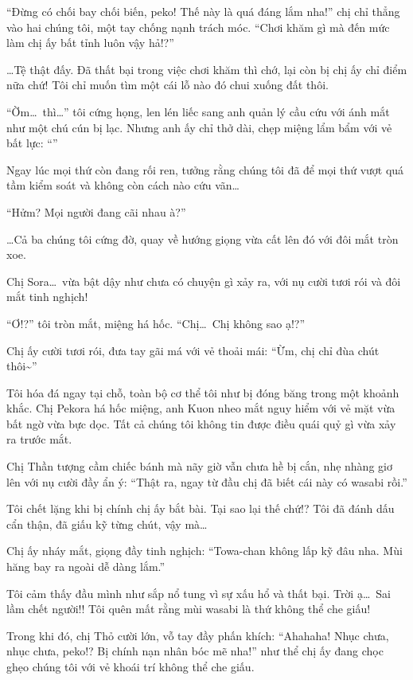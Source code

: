 \documentclass[../main.tex]{subfiles}
\begin{document}
``Đừng có chối bay chối biến, peko! Thế này là quá đáng lắm nha!'' chị chỉ thẳng vào hai chúng tôi, một tay chống nạnh trách móc. ``Chơi khăm gì mà đến mức làm chị ấy bất tỉnh luôn vậy hả!?''

\dots Tệ thật đấy. Đã thất bại trong việc chơi khăm thì chớ, lại còn bị chị ấy chỉ điểm nữa chứ! Tôi chỉ muốn tìm một cái lỗ nào đó chui xuống đất thôi.

``Ờm\dots\ thì\dots'' tôi cứng họng, len lén liếc sang anh quản lý cầu cứu với ánh mắt như một chú cún bị lạc. Nhưng anh ấy chỉ thở dài, chẹp miệng lẩm bẩm với vẻ bất lực: ``''

Ngay lúc mọi thứ còn đang rối ren, tưởng rằng chúng tôi đã để mọi thứ vượt quá tầm kiểm soát và không còn cách nào cứu vãn\dots

``Hửm? Mọi người đang cãi nhau à?''

\dots Cả ba chúng tôi cứng đờ, quay về hướng giọng vừa cất lên đó với đôi mắt tròn xoe.

Chị Sora\dots\ vừa bật dậy như chưa có chuyện gì xảy ra, với nụ cười tươi rói và đôi mắt tinh nghịch!

``Ơ!?'' tôi tròn mắt, miệng há hốc. ``Chị\dots\ Chị không sao ạ!?''

Chị ấy cười tươi rói, đưa tay gãi má với vẻ thoải mái: ``Ừm, chị chỉ đùa chút thôi\~{}''

Tôi hóa đá ngay tại chỗ, toàn bộ cơ thể tôi như bị đóng băng trong một khoảnh khắc. Chị Pekora há hốc miệng, anh Kuon nheo mắt nguy hiểm với vẻ mặt vừa bất ngờ vừa bực dọc. Tất cả chúng tôi không tin được điều quái quỷ gì vừa xảy ra trước mắt.

Chị Thần tượng cầm chiếc bánh mà nãy giờ vẫn chưa hề bị cắn, nhẹ nhàng giơ lên với nụ cười đầy ẩn ý: ``Thật ra, ngay từ đầu chị đã biết cái này có wasabi rồi.''

Tôi chết lặng khi bị chính chị ấy bắt bài. Tại sao lại thế chứ!? Tôi đã đánh dấu cẩn thận, đã giấu kỹ từng chút, vậy mà\dots

Chị ấy nháy mắt, giọng đầy tinh nghịch: ``Towa-chan không lấp kỹ đâu nha. Mùi hăng bay ra ngoài dễ dàng lắm.''

Tôi cảm thấy đầu mình như sắp nổ tung vì sự xấu hổ và thất bại. Trời ạ\dots\ Sai lầm chết người!! Tôi quên mất rằng mùi wasabi là thứ không thể che giấu!

Trong khi đó, chị Thỏ cười lớn, vỗ tay đầy phấn khích: ``A\uparrow ha\downarrow ha\uparrow ha\downarrow! Nhục chưa, nhục chưa, peko!? Bị chính nạn nhân bóc mẽ nha!'' như thể chị ấy đang chọc ghẹo chúng tôi với vẻ khoái trí không thể che giấu.
\end{document}
